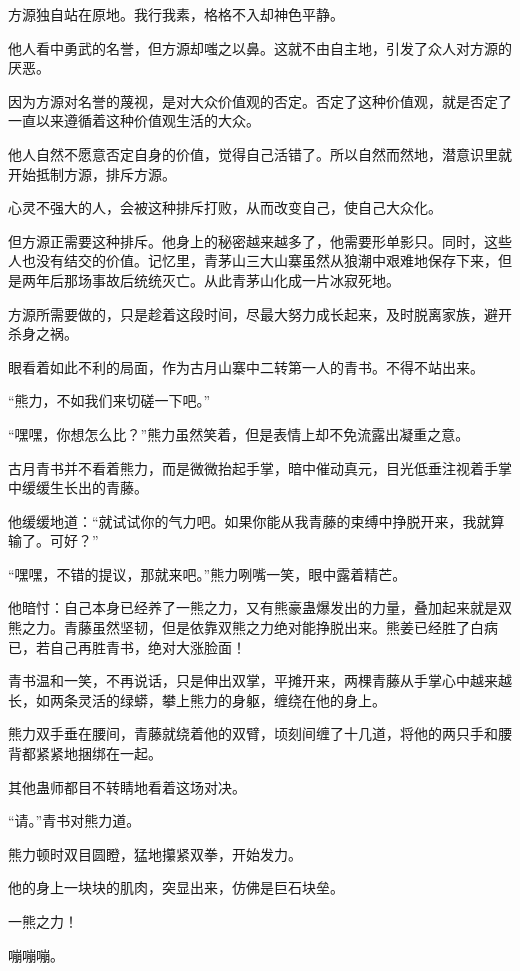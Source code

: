 \begin{this_body}
方源独自站在原地。我行我素，格格不入却神色平静。

他人看中勇武的名誉，但方源却嗤之以鼻。这就不由自主地，引发了众人对方源的厌恶。

因为方源对名誉的蔑视，是对大众价值观的否定。否定了这种价值观，就是否定了一直以来遵循着这种价值观生活的大众。

他人自然不愿意否定自身的价值，觉得自己活错了。所以自然而然地，潜意识里就开始抵制方源，排斥方源。

心灵不强大的人，会被这种排斥打败，从而改变自己，使自己大众化。

但方源正需要这种排斥。他身上的秘密越来越多了，他需要形单影只。同时，这些人也没有结交的价值。记忆里，青茅山三大山寨虽然从狼潮中艰难地保存下来，但是两年后那场事故后统统灭亡。从此青茅山化成一片冰寂死地。

方源所需要做的，只是趁着这段时间，尽最大努力成长起来，及时脱离家族，避开杀身之祸。

眼看着如此不利的局面，作为古月山寨中二转第一人的青书。不得不站出来。

“熊力，不如我们来切磋一下吧。”

“嘿嘿，你想怎么比？”熊力虽然笑着，但是表情上却不免流露出凝重之意。

古月青书并不看着熊力，而是微微抬起手掌，暗中催动真元，目光低垂注视着手掌中缓缓生长出的青藤。

他缓缓地道：“就试试你的气力吧。如果你能从我青藤的束缚中挣脱开来，我就算输了。可好？”

“嘿嘿，不错的提议，那就来吧。”熊力咧嘴一笑，眼中露着精芒。

他暗忖：自己本身已经养了一熊之力，又有熊豪蛊爆发出的力量，叠加起来就是双熊之力。青藤虽然坚韧，但是依靠双熊之力绝对能挣脱出来。熊姜已经胜了白病已，若自己再胜青书，绝对大涨脸面！

青书温和一笑，不再说话，只是伸出双掌，平摊开来，两棵青藤从手掌心中越来越长，如两条灵活的绿蟒，攀上熊力的身躯，缠绕在他的身上。

熊力双手垂在腰间，青藤就绕着他的双臂，顷刻间缠了十几道，将他的两只手和腰背都紧紧地捆绑在一起。

其他蛊师都目不转睛地看着这场对决。

“请。”青书对熊力道。

熊力顿时双目圆瞪，猛地攥紧双拳，开始发力。

他的身上一块块的肌肉，突显出来，仿佛是巨石块垒。

一熊之力！

嘣嘣嘣。


\end{this_body}

